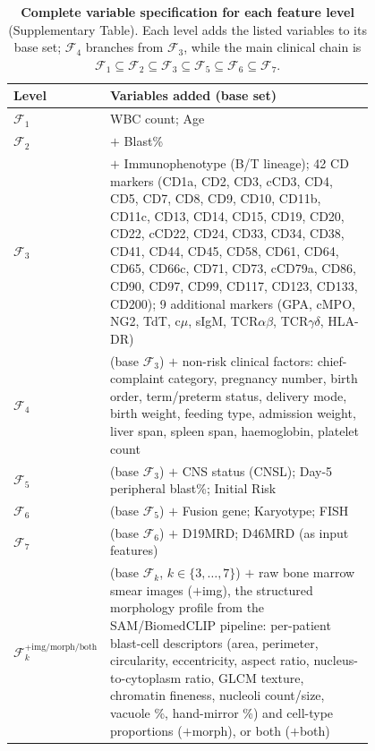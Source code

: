 \documentclass[pdflatex,sn-nature]{sn-jnl}
\begin{document}
\begin{table}[ht]
\caption{\textbf{Complete variable specification for each feature level}
(Supplementary Table). Each level adds the listed variables to its base
set; $\mathcal{F}_4$ branches from $\mathcal{F}_3$,
while the main clinical chain is
$\mathcal{F}_1\!\subseteq\!\mathcal{F}_2\!\subseteq\!\mathcal{F}_3\!
\subseteq\!\mathcal{F}_5\!\subseteq\!\mathcal{F}_6\!\subseteq\!\mathcal{F}_7$.}
\label{tab:featurelist}
\centering
\footnotesize
\setlength{\tabcolsep}{4pt}
\begin{tabular}{@{}l p{0.80\linewidth}@{}}
\toprule
\textbf{Level} & \textbf{Variables added (base set)} \\
\midrule
$\mathcal{F}_1$ & WBC count; Age \\
$\mathcal{F}_2$ & $+$ Blast\% \\
$\mathcal{F}_3$ & $+$ Immunophenotype (B/T lineage); 42 CD markers (CD1a, CD2, CD3, cCD3, CD4, CD5, CD7, CD8, CD9, CD10, CD11b, CD11c, CD13, CD14, CD15, CD19, CD20, CD22, cCD22, CD24, CD33, CD34, CD38, CD41, CD44, CD45, CD58, CD61, CD64, CD65, CD66c, CD71, CD73, cCD79a, CD86, CD90, CD97, CD99, CD117, CD123, CD133, CD200); 9 additional markers (GPA, cMPO, NG2, TdT, c$\mu$, sIgM, TCR$\alpha\beta$, TCR$\gamma\delta$, HLA-DR) \\
$\mathcal{F}_4$ & (base $\mathcal{F}_3$) $+$ non-risk clinical factors: chief-complaint category, pregnancy number, birth order, term/preterm status, delivery mode, birth weight, feeding type, admission weight, liver span, spleen span, haemoglobin, platelet count \\
$\mathcal{F}_5$ & (base $\mathcal{F}_3$) $+$ CNS status (CNSL); Day-5 peripheral blast\%; Initial Risk \\
$\mathcal{F}_6$ & (base $\mathcal{F}_5$) $+$ Fusion gene; Karyotype; FISH \\
$\mathcal{F}_7$ & (base $\mathcal{F}_6$) $+$ D19MRD; D46MRD (as input features) \\
$\mathcal{F}_k^{+\text{img/morph/both}}$ & (base $\mathcal{F}_k$, $k\in\{3,\dots,7\}$) $+$ raw bone marrow smear images ($+$img), the structured morphology profile from the SAM/BiomedCLIP pipeline: per-patient blast-cell descriptors (area, perimeter, circularity, eccentricity, aspect ratio, nucleus-to-cytoplasm ratio, GLCM texture, chromatin fineness, nucleoli count/size, vacuole \%, hand-mirror \%) and cell-type proportions ($+$morph), or both ($+$both) \\
\bottomrule
\end{tabular}
\end{table}
\end{document}

